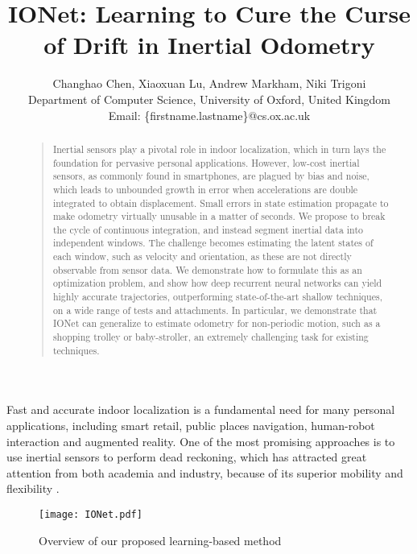 \documentclass[letterpaper]{article}
\begin{document}
\title{IONet: Learning to Cure the Curse of Drift in Inertial Odometry}
\author{Changhao Chen, Xiaoxuan Lu, Andrew Markham, Niki Trigoni\\
Department of Computer Science, University of Oxford, United Kingdom\\
Email: \{firstname.lastname\}@cs.ox.ac.uk\\
}
\maketitle
\begin{abstract}
\begin{quote}
	Inertial sensors play a pivotal role in indoor localization, which in turn lays the foundation for pervasive personal applications. However, low-cost inertial sensors, as commonly found in smartphones, are plagued by bias and noise, which leads to unbounded growth in error when accelerations are double integrated to obtain displacement. Small errors in state estimation propagate to make odometry virtually unusable in a matter of seconds. We propose to break the cycle of continuous integration, and instead segment inertial data into independent windows. The challenge becomes estimating the latent states of each window, such as velocity and orientation, as these are not directly observable from sensor data. We demonstrate how to formulate this as an optimization problem, and show how deep recurrent neural networks can yield highly accurate trajectories, outperforming state-of-the-art shallow techniques, on a wide range of tests and attachments. In particular, we demonstrate that IONet can generalize to estimate odometry for non-periodic motion, such as a shopping trolley or baby-stroller, an extremely challenging task for existing techniques.
\end{quote}
\end{abstract}

\noindent Fast and accurate indoor localization is a fundamental need for many personal applications, including smart retail, public places navigation, human-robot interaction and augmented reality. One of the most promising approaches is to use inertial sensors to perform dead reckoning, which has attracted great attention from both academia and industry, because of its superior mobility and flexibility \cite{Lymberopoulos2015}.
    
    \begin{figure}
    	\centering
        \texttt{[image: IONet.pdf]}
        \caption{\label{fig:IONet} Overview of our proposed learning-based method}
    \end{figure} 
    
\end{document}
